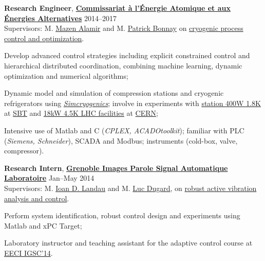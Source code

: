 \documentclass[a4paper,11pt]{article}
\begin{document}
	\vspace{0.1cm}
	
	\textbf{Research Engineer},
	\href{http://www.cea.fr/}{\textbf{Commissariat \`{a} l'\'{E}nergie Atomique et aux \'{E}nergies Alternatives}}
	\hfill {2014--2017} \\
	Supervisors: M. \href{http://www.mazenalamir.fr/home/}{Mazen Alamir} and M. \href{https://www.researchgate.net/profile/P_Bonnay}{Patrick Bonnay} on \href{https://vuongvtrinh.github.io/project/cryogenic-refrigerator/}{cryogenic process control and optimization}.
	\begin{innerlist}
		\item Develop advanced control strategies including explicit constrained control and hierarchical distributed coordination, combining machine learning, dynamic optimization and numerical algorithms;
		\item Dynamic model and simulation of compression stations and cryogenic refrigerators using \href{http://www.d-sbt.fr/en/Pages/News/2016_Francois-Bonne.aspx}{\emph{Simcryogenics}}; involve in experiments with \href{http://inac.cea.fr/en/Phocea/Vie_des_labos/Ast/ast_visu.php?id_ast=771}{station 400W 1.8K} at \href{http://www.d-sbt.fr/en}{SBT} and \href{https://cds.cern.ch/record/708291}{18kW 4.5K LHC facilities} at \href{https://cern.ch}{CERN};
		\item Intensive use of Matlab and C (\emph{CPLEX, ACADOtoolkit}); familiar with PLC (\emph{Siemens, Schneider}), SCADA and Modbus; instruments (cold-box, valve, compressor).
	\end{innerlist}
	
	\vspace{0.1cm}
	
	\textbf{Research Intern},
	\href{http://www.gipsa-lab.fr/}{\textbf{Grenoble Images Parole Signal Automatique Laboratoire}}
	\hfill {Jan--May 2014}\\
	Supervisors: M. \href{https://www.gipsa-lab.grenoble-inp.fr/~ioandore.landau/}{Ioan D. Landau} and M. \href{https://www.researchgate.net/profile/Luc_Dugard}{Luc Dugard}, on \href{https://www.gipsa-lab.grenoble-inp.fr/~ioandore.landau/benchmark_adaptive_regulation/}{robust active vibration analysis and control}.
	\begin{innerlist}
		\item Perform system identification, robust control design and experiments using Matlab and xPC Target;
		\item  Laboratory instructor and teaching assistant for the adaptive control course at \href{http://www.eeci-igsc.eu/}{EECI IGSC'14}.
	\end{innerlist}
	
\end{document}
